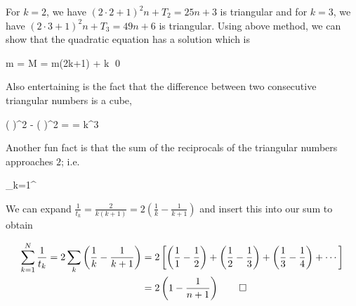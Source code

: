 For $k=2$, we have $(2 \cdot 2 + 1)^2 n + T_2 = 25n + 3$ is triangular and for $k=3$, we have $(2 \cdot 3 + 1)^2 n + T_3 = 49n + 6$ is triangular. Using above method, we can show that the quadratic equation has a solution which is

\bee
m =  \rightarrow M = m(2k+1) + k \qed
\eee


Also entertaining is the fact that the difference between two consecutive triangular numbers is a cube,

\bee
\left(  \right)^2 - \left(  \right)^2 = \cdots = k^3
\eee

Another fun fact is that the sum of the reciprocals of the triangular numbers approaches $2$; i.e.

\bee
\sum_{k=1}^\infty {} 
\eee

We can expand $\frac{1}{t_k} = \frac{2}{k(k+1)} = 2 \left( \frac{1}{k}- \frac{1}{k+1}\right)$ and insert this into our sum to obtain

\begin{align*}
  \sum_{k=1}^N \frac{1}{t_k} = 2 \sum_k \left( \frac{1}{k}- \frac{1}{k+1}\right) &= 2 \left[ \left( \frac{1}{1} - \frac{1}{2} \right) + \left( \frac{1}{2} - \frac{1}{3} \right) + \left( \frac{1}{3} - \frac{1}{4} \right) + \cdots \right] \\
  &= 2 \left( 1 - \frac{1}{n+1}\right) \qed
\end{align*}


